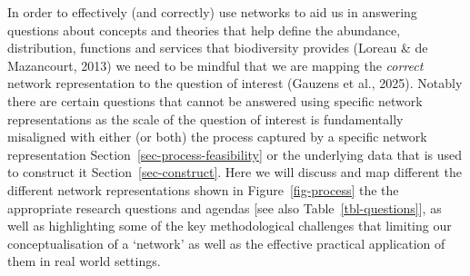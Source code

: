 \documentclass[
]{article}
\begin{document}
In order to effectively (and correctly) use networks to aid us in
answering questions about concepts and theories that help define the
abundance, distribution, functions and services that biodiversity
provides (Loreau \& de Mazancourt, 2013) we need to be mindful that we
are mapping the \emph{correct} network representation to the question of
interest (Gauzens et al., 2025). Notably there are certain questions
that cannot be answered using specific network representations as the
scale of the question of interest is fundamentally misaligned with
either (or both) the process captured by a specific network
representation Section~\ref{sec-process-feasibility} or the underlying
data that is used to construct it Section~\ref{sec-construct}. Here we
will discuss and map different the different network representations
shown in Figure~\ref{fig-process} the the appropriate research questions
and agendas {[}see also Table~\ref{tbl-questions}{]}, as well as
highlighting some of the key methodological challenges that limiting our
conceptualisation of a `network' as well as the effective practical
application of them in real world settings.
\end{document}
